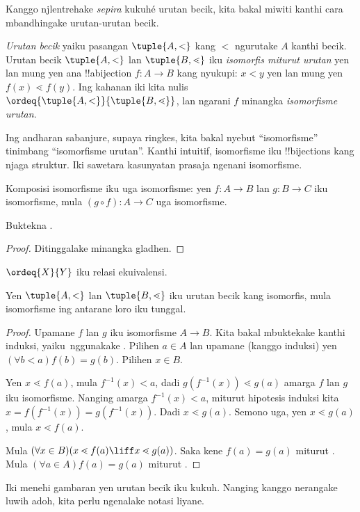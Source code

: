 \documentclass[../../../include/open-logic-section]{subfiles}
\begin{document}

Kanggo njlentrehake \emph{sepira} kukuhé urutan becik,
kita bakal miwiti kanthi cara mbandhingake urutan-urutan
becik.

\begin{defn}
\emph{Urutan becik} yaiku pasangan $\tuple{A, <}$ kang
$<$ ngurutake $A$ kanthi becik. Urutan becik
$\tuple{A, <}$ lan $\tuple{B, \lessdot}$ iku
\emph{isomorfis miturut urutan} yen lan mung yen ana
!!a{bijection} $f \colon A \to B$ kang nyukupi:
$x < y$ yen lan mung yen $f(x) \lessdot  f(y)$.
Ing kahanan iki kita nulis
$\ordeq{\tuple{A, <}}{\tuple{B, \lessdot}}$, lan
ngarani $f$ minangka \emph{isomorfisme urutan}.
\end{defn}
\noindent
Ing andharan sabanjure, supaya ringkes, kita bakal nyebut
``isomorfisme'' tinimbang ``isomorfisme urutan''.
Kanthi intuitif, isomorfisme iku !!{bijection}s
kang njaga struktur. Iki sawetara kasunyatan prasaja
ngenani isomorfisme.

\begin{lem}
Komposisi isomorfisme iku uga isomorfisme: yen
$f \colon A \to B$ lan $g \colon B \to C$ iku
isomorfisme, mula $(g \circ f) \colon A \to C$
uga isomorfisme.
\end{lem}
\begin{prob}
	Buktekna .
\end{prob}
\begin{proof}
Ditinggalake minangka gladhen.
\end{proof}
\begin{cor}
	$\ordeq{X}{Y}$ iku relasi ekuivalensi.
\end{cor}
\begin{prop}
Yen $\tuple{A, <}$ lan $\tuple{B, \lessdot}$ iku
urutan becik kang isomorfis, mula isomorfisme ing
antarane loro iku tunggal.
\end{prop}

\begin{proof}
Upamane $f$ lan $g$ iku isomorfisme $A \to B$.
Kita bakal mbuktekake kanthi induksi, yaiku\ nggunakake
. Pilihen $a\in A$ lan
upamane (kanggo induksi) yen $(\forall b < a)f(b) = g(b)$.
Pilihen $x \in B$.

Yen $x \lessdot f(a)$, mula $f^{-1}(x) < a$,
dadi $g(f^{-1}(x)) \lessdot g(a)$ amarga $f$ lan $g$
iku isomorfisme. Nanging amarga $f^{-1}(x) < a$,
miturut hipotesis induksi kita
$x =f(f^{-1}(x)) = g(f^{-1}(x))$. Dadi
$x \lessdot g(a)$. Semono uga, yen $x \lessdot g(a)$,
mula $x \lessdot f(a)$.

Mula $(\forall x \in B)(x \lessdot f(a) \liff x \lessdot
g(a))$. Saka kene $f(a) = g(a)$ miturut
.
Mula $(\forall a \in A)f(a) = g(a)$ miturut
.
\end{proof}\noindent 
Iki menehi gambaran yen urutan becik iku kukuh.
Nanging kanggo nerangake luwih adoh, kita perlu
ngenalake notasi liyane.
\end{document}
